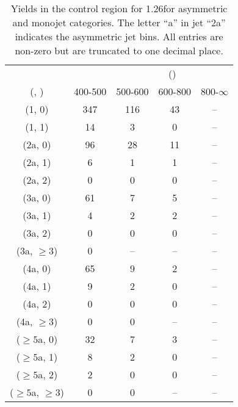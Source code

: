 \begin{table}[h!]
\tiny
\centering
\caption{Yields in the \gj control region for 1.26\ifb for asymmetric and monojet categories. The letter ``a'' in jet \eg ``2a''  indicates the asymmetric jet bins. All entries are non-zero but are truncated to one decimal place.\label{tab:yieldssep_data_gj_asym}}
\begin{tabular}
{ccccc}
	\hline\hline
&	& \multicolumn{4}{c}{\scalht (\gev)} \\ 
	 (\njet,  \nb) & 400-500 & 500-600 & 600-800 & 800-$\infty$ \\ [0.8ex] 
\hline
	(1, 0) & 347 & 116 & 43 & -- \\[0.5ex] 
	(1, 1) & 14 & 3 & 0 & -- \\[0.5ex] 
	(2a, 0) & 96 & 28 & 11 & -- \\[0.5ex] 
	(2a, 1) & 6 & 1 & 1 & -- \\[0.5ex] 
	(2a, 2) & 0 & 0 & 0 & -- \\[0.5ex] 
	(3a, 0) & 61 & 7 & 5 & -- \\[0.5ex] 
	(3a, 1) & 4 & 2 & 2 & -- \\[0.5ex] 
	(3a, 2) & 0 & 0 & 0 & -- \\[0.5ex] 
	(3a, $\ge3$) & 0 & -- & -- & -- \\[0.5ex] 
	(4a, 0) & 65 & 9 & 2 & -- \\[0.5ex] 
	(4a, 1) & 9 & 2 & 0 & -- \\[0.5ex] 
	(4a, 2) & 0 & 0 & 0 & -- \\[0.5ex] 
	(4a, $\ge3$) & 0 & 0 & -- & -- \\[0.5ex] 
	($\ge5$a, 0) & 32 & 7 & 3 & -- \\[0.5ex] 
	($\ge5$a, 1) & 8 & 2 & 0 & -- \\[0.5ex] 
	($\ge5$a, 2) & 2 & 0 & 0 & -- \\[0.5ex] 
	($\ge5$a, $\ge3$) & 0 & 0 & -- & -- \\[0.5ex] 
	\hline
	\hline
\end{tabular}
\end{table}
